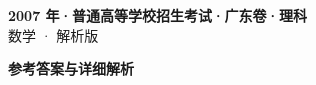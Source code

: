\documentclass[zihao=-4, a4paper]{ctexart}
\begin{document}
\begin{center}
  {\Large\bfseries 2007 年·普通高等学校招生考试·广东卷·理科}\\[4pt]
  {\large 数学 · 解析版}
\end{center}
\medskip
{}

\clearpage
{}
\begin{center}{\Large\bfseries 参考答案与详细解析}\end{center}
\medskip

\end{document}
